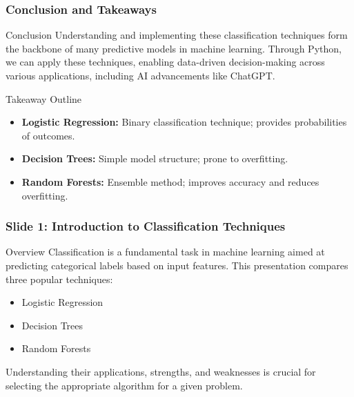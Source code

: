 \documentclass[aspectratio=169]{beamer}
\begin{document}
\begin{frame}
    \frametitle{Conclusion and Takeaways}
    \begin{block}{Conclusion}
        Understanding and implementing these classification techniques form the backbone of many predictive models in machine learning. Through Python, we can apply these techniques, enabling data-driven decision-making across various applications, including AI advancements like ChatGPT.
    \end{block}
    \begin{block}{Takeaway Outline}
        \begin{itemize}
            \item \textbf{Logistic Regression:} Binary classification technique; provides probabilities of outcomes.
            \item \textbf{Decision Trees:} Simple model structure; prone to overfitting.
            \item \textbf{Random Forests:} Ensemble method; improves accuracy and reduces overfitting.
        \end{itemize}
    \end{block}
\end{frame}

\begin{frame}[fragile]
    \frametitle{Slide 1: Introduction to Classification Techniques}
    \begin{block}{Overview}
        Classification is a fundamental task in machine learning aimed at predicting categorical labels based on input features. This presentation compares three popular techniques: 
        \begin{itemize}
            \item Logistic Regression
            \item Decision Trees
            \item Random Forests
        \end{itemize}
        Understanding their applications, strengths, and weaknesses is crucial for selecting the appropriate algorithm for a given problem.
    \end{block}
\end{frame}
\end{document}
